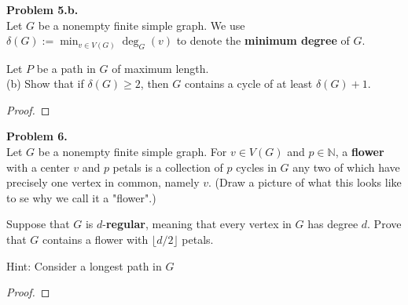 \documentclass{article}
\newcommand{\N}{\mathbb{N}}
\newenvironment{hwproof}[2]
{
    \textbf{Problem #1.}\\
    #2
    \begin{proof}
}{
    \end{proof}
}
\begin{document}
\begin{hwproof}
    {5.b}
    {
        Let $G$ be a nonempty finite simple graph. We use
        $\delta(G) := \min_{v \in V(G)}\deg_G(v)$ to denote the \textbf{minimum degree}
        of $G$.

        Let $P$ be a path in $G$ of maximum length.\\
        (b) Show that if $\delta(G) \geq 2$, then $G$ contains a cycle of at least
        $\delta(G) + 1$.

    }
\end{hwproof}

\begin{hwproof}
    {6}
    {Let $G$ be a nonempty finite simple graph. For $v \in V(G)$ and $p \in \N$, a
        \textbf{flower} with a center $v$ and $p$ petals is a collection of $p$ cycles
        in $G$ any two of which have precisely one vertex in common, namely $v$.
        (Draw a picture of what this looks like to se why we call it a "flower".)

        Suppose that $G$ is $d$-\textbf{regular}, meaning that every vertex in $G$
        has degree $d$. Prove that $G$ contains a flower with $\lfloor d/2 \rfloor$
        petals.

        Hint: Consider a longest path in $G$}
\end{hwproof}
\end{document}
